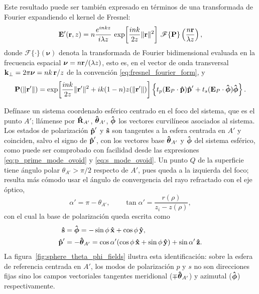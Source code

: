 Este resultado puede ser también expresado en términos de una transformada de Fourier expandiendo el kernel de Fresnel:
\begin{equation}
\vb{E}'(\vb r,z)
=
n\frac{e^{inkz}}{i\lambda z}\,
\exp\!\left[
\frac{ink}{2z}\|\vb r\|^2
\right]
\,
\mathscr F\{\vb P\}
\left(
\frac{n\vb r}{\lambda z}
\right),
\label{E_in_observation_plane_as_FT_3D}
\end{equation}
donde $\mathscr F\{\cdot\}(\boldsymbol\nu)$ denota la transformada de Fourier bidimensional evaluada en la frecuencia espacial $\boldsymbol\nu=n\vb r/(\lambda z)$, esto es, en el vector de onda transversal $\vb k_\perp=2\pi\boldsymbol\nu=nk\,\vb r/z$ de la convención \eqref{eq:fresnel_fourier_form}, y
\begin{equation}
\vb P(\|\vb r'\|)
=
\exp\!\left[
\frac{ink}{2z}\|\vb r'\|^2
+
ik(1-n)z(\|\vb r'\|)
\right]
\left\{
t_p (\vb{E}_P\cdot \bm{\hat{\mathbf{p}}}) \bm{\hat{\mathbf{p}}}'
+
t_s (\vb{E}_P\cdot \bm{\hat{\mathbf{\phi}}}) \bm{\hat{\mathbf{\phi}}}
\right\}.
\label{eq:P_definition}
\end{equation}

Defínase un sistema coordenado esférico centrado en el foco del sistema, que es el punto $A'$; llámense por $\bm{\hat{\mathbf{R}}}_{A'}$, $\bm{\hat{\mathbf{\theta}}}_{A'}$, $\bm{\hat{\mathbf{\phi}}}$ los vectores curvilíneos asociados al sistema. Los estados de polarización $\bm{\hat{\mathbf{p}}}'$ y $\bm{\hat{\mathbf{s}}}$ son tangentes a la esfera centrada en $A'$ y coinciden, salvo el signo de $\bm{\hat{\mathbf{p}}}'$, con los vectores base $\bm{\hat{\mathbf{\theta}}}_{A'}$ y $\bm{\hat{\mathbf{\phi}}}$ del sistema esférico, como puede ser comprobado con facilidad desde las expresiones \eqref{eq:p_prime_mode_ovoid} y \eqref{eq:s_mode_ovoid}. Un punto $Q$ de la superficie tiene ángulo polar $\theta_{A'}>\pi/2$ respecto de $A'$, pues queda a la izquierda del foco; resulta más cómodo usar el ángulo de convergencia del rayo refractado con el eje óptico,
\begin{equation}
  \alpha' = \pi-\theta_{A'},
  \qquad
  \tan\alpha' = \frac{r(\rho)}{z_i-z(\rho)},
  \label{eq:alpha_prime_def}
\end{equation}
con el cual la base de polarización queda escrita como
\begin{align}
\bm{\hat{\mathbf{s}}}
&=
\bm{\hat{\mathbf{\phi}}}
=
-\sin\phi\,\bm{\hat{\mathbf{x}}}
+
\cos\phi\,\bm{\hat{\mathbf{y}}},
\\
\bm{\hat{\mathbf{p}}}'
&=
-\bm{\hat{\mathbf{\theta}}}_{A'}
=
\cos\alpha'
(\cos\phi\,\bm{\hat{\mathbf{x}}}+\sin\phi\,\bm{\hat{\mathbf{y}}})
+
\sin\alpha'\,\bm{\hat{\mathbf{z}}}.
\label{s_p_in_A_prime_system}
\end{align}
La figura~\ref{fig:sphere_theta_phi_fields} ilustra esta identificación: sobre la esfera de referencia centrada en $A'$, los modos de polarización $p$ y $s$ no son direcciones fijas sino los campos vectoriales tangentes meridional ($\mp\bm{\hat{\mathbf{\theta}}}_{A'}$) y azimutal ($\bm{\hat{\mathbf{\phi}}}$) respectivamente.

